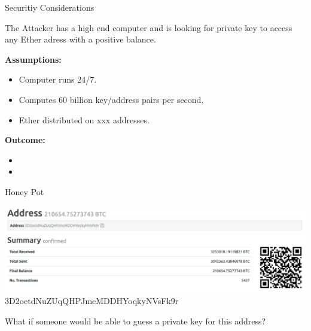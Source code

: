 \documentclass[handout]{beamer}
\begin{document}
\begin{frame}{Securitiy Considerations}

The Attacker has a high end computer and is looking for private key to access any Ether adress with a positive balance.

\vspace{1em}

\textbf{Assumptions:}
\begin{itemize}
\item<1-> Computer runs 24/7. 
\item<2-> Computes 60 billion key/address pairs per second.
\item<3-> Ether distributed on xxx addresses.
\end{itemize}

\vspace{1em}

\textbf{Outcome:}
\begin{itemize}
\item<1-> 
\item<2-> 
\end{itemize}

\end{frame}

\begin{frame}{Honey Pot}

\begin{center}
\includegraphics[width = 10 cm, frame]{../assets/images/honeypot}
3D2oetdNuZUqQHPJmcMDDHYoqkyNVsFk9r \\
\end{center}
\vspace{1em}
What if someone would be able to guess a private  key for this address?

\end{frame}
\end{document}
